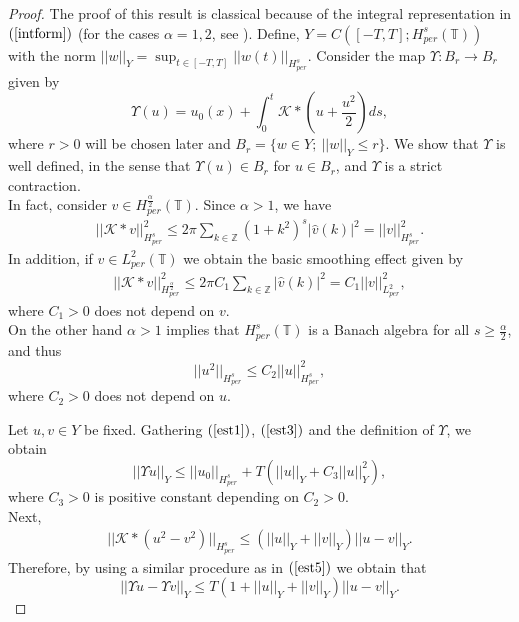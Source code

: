 \documentclass[12pt,reqno]{amsart}
\newcommand{\2}{L^2_{per}(0, T)}
\newcommand{\Hpers}{{H_{per}^{s}(\mathbb{T})}}
\newcommand{\Hns}{{H_{per}^{s}}}
\numberwithin{equation}{section}
\numberwithin{figure}{section}
\begin{document}
\begin{proof}
	The proof of this result is classical because of the integral representation in $(\ref{intform})$ (for the cases $\alpha=1,2$, see \cite{an-ban-scia1}). Define, $Y=C([-T,T];H_{per}^{s}(\mathbb{T}))$ with the norm $||w||_{Y}=\sup_{t\in[-T,T]}||w(t)||_{H_{per}^{s}}$. Consider the map $\Upsilon: B_{r}\rightarrow B_r$ given by \begin{equation}\label{duh}\Upsilon (u)=\displaystyle u_0(x)+\int_0^t\mathcal{K}\ast \left(u+\frac{u^2}{2}\right)ds,\end{equation}
	where $r>0$ will be chosen later and $B_r=\{w\in Y;\  ||w||_{Y}\leq r\}$. We show that $\Upsilon$ is well defined, in the sense that $\Upsilon(u)\in B_r$ for $u\in B_r$, and $\Upsilon$ is a strict contraction.\\
	\indent In fact, consider $v\in H_{per}^{\frac{\alpha}{2}}(\mathbb{T})$. Since $\alpha>1$, we have
	\begin{equation}\label{est1}\begin{array}{llll}
	||\mathcal{K}\ast v||_{H_{per}^{s}}^2\leq \displaystyle 2\pi\sum_{k\in\mathbb{Z}}(1+k^2)^{s}|\hat{v}(k)|^2=
	||v||_{H_{per}^{s}}^2.
	\end{array}\end{equation}
	In addition, if $v\in L_{per}^2(\mathbb{T})$ we obtain the basic smoothing effect given by
	\begin{equation}\label{est2}\begin{array}{llll}
	||\mathcal{K}\ast v||_{H_{per}^{\frac{\alpha}{2}}}^2\leq \displaystyle 2\pi C_1\sum_{k\in\mathbb{Z}}|\hat{v}(k)|^2=C_1||v||_{L_{per}^{2}}^2,
	\end{array}\end{equation}	
	where $C_1>0$ does not depend on $v$.\\
	\indent On the other hand $\alpha>1$ implies that $\Hpers$ is a Banach algebra for all $s\geq\frac{\alpha}{2}$, and thus
	\begin{equation}\label{est3}
	||u^2||_{\Hns}\leq C_2 ||u||_{\Hns}^2,
	\end{equation}
	where $C_2>0$ does not depend on $u$.
	
	Let $u,v\in Y$ be fixed. Gathering $(\ref{est1})$, $(\ref{est3})$ and the definition of $\Upsilon$, we obtain
	\begin{equation}\label{est5}
	||\Upsilon u||_{Y}\leq ||u_0||_{\Hns}+T\left(||u||_{Y}+C_3||u||_{Y}^2\right),
	\end{equation}
	where $C_3>0$ is positive constant depending on $C_2>0$.\\
	\indent Next,
	\begin{equation}\label{est6}\begin{array}{lllll}
	||\mathcal{K}\ast(u^2-v^2)||_{\Hns}\leq \left(||u||_Y+||v||_{Y}\right)||u-v||_{Y}.
	\end{array}
	\end{equation}
	Therefore, by using a similar procedure as in $(\ref{est5})$ we obtain that
	\begin{equation}\label{est7}
	||\Upsilon u-\Upsilon v||_{Y}\leq T\left(1+||u||_Y+||v||_Y\right)||u-v||_Y.
	\end{equation}
	

\end{proof}
\end{document}

